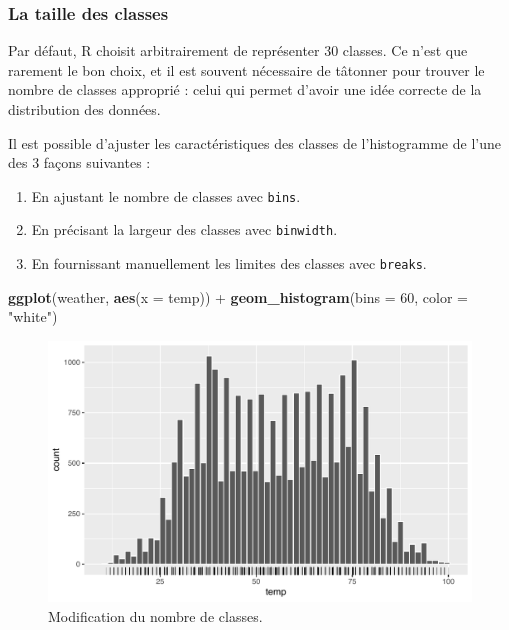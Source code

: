 \documentclass[a4paperpaper,]{article}
\newenvironment{Shaded}{\begin{snugshade}}{\end{snugshade}}
\newcommand{\DataTypeTok}[1]{\textcolor[rgb]{0.00,0.34,0.68}{#1}}
\newcommand{\DecValTok}[1]{\textcolor[rgb]{0.69,0.50,0.00}{#1}}
\newcommand{\KeywordTok}[1]{\textcolor[rgb]{0.12,0.11,0.11}{\textbf{#1}}}
\newcommand{\NormalTok}[1]{\textcolor[rgb]{0.12,0.11,0.11}{#1}}
\newcommand{\OperatorTok}[1]{\textcolor[rgb]{0.12,0.11,0.11}{#1}}
\newcommand{\StringTok}[1]{\textcolor[rgb]{0.75,0.01,0.01}{#1}}
\providecommand{\tightlist}{%
  \setlength{\itemsep}{0pt}\setlength{\parskip}{0pt}}
\begin{document}
\hypertarget{la-taille-des-classes}{%
\subsubsection{La taille des classes}\label{la-taille-des-classes}}

Par défaut, R choisit arbitrairement de représenter 30 classes. Ce n'est que rarement le bon choix, et il est souvent nécessaire de tâtonner pour trouver le nombre de classes approprié : celui qui permet d'avoir une idée correcte de la distribution des données.

Il est possible d'ajuster les caractéristiques des classes de l'histogramme de l'une des 3 façons suivantes :

\begin{enumerate}
\def\labelenumi{\arabic{enumi}.}
\tightlist
\item
  En ajustant le nombre de classes avec \texttt{bins}.
\item
  En précisant la largeur des classes avec \texttt{binwidth}.
\item
  En fournissant manuellement les limites des classes avec \texttt{breaks}.
\end{enumerate}

\begin{Shaded}
\begin{Highlighting}[]
\KeywordTok{ggplot}\NormalTok{(weather, }\KeywordTok{aes}\NormalTok{(}\DataTypeTok{x =}\NormalTok{ temp)) }\OperatorTok{+}
\StringTok{  }\KeywordTok{geom_histogram}\NormalTok{(}\DataTypeTok{bins =} \DecValTok{60}\NormalTok{, }\DataTypeTok{color =} \StringTok{"white"}\NormalTok{)}
\end{Highlighting}
\end{Shaded}

\begin{figure}[htpb]

{\centering \includegraphics[width=0.9\linewidth]{figure/unnamed-chunk-49-1} 

}

\caption{Modification du nombre de classes.}\label{fig:unnamed-chunk-49}
\end{figure}
\end{document}
